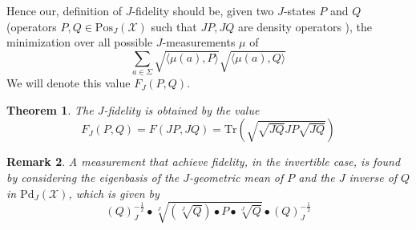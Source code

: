 \documentclass{amsart}
\numberwithin{equation}{section}
\newtheorem{theorem}{Theorem}[section]
\newtheorem{remark}[theorem]{Remark}
\theoremstyle{definition}
\theoremstyle{plain}
\theoremstyle{solutionstyle}
\begin{document}
Hence our, definition of $J$-fidelity should be, given two $J$-states $P$ and $Q$ (operators $P,Q\in \mathrm{Pos}_J(\mathcal{X})$ such that $JP,JQ$ are density operators \cite{FelipeSosa2022}), the minimization over all possible $J$-measurements $\mu$ of 
\begin{equation*}\sum_{a\in \Sigma}\sqrt{\langle \mu(a), P\rangle}\sqrt{\langle \mu(a),Q\rangle}\end{equation*}
We will denote this value $F_J(P,Q)$.
\begin{theorem}
    The $J$-fidelity is obtained by the value 
    \begin{equation*}F_J(P,Q)=F(JP,JQ)=\mathrm{Tr}\left(\sqrt{\sqrt{{JQ}}JP\sqrt{{JQ}}}\right)\end{equation*}
\end{theorem}
\begin{remark}\label{Fidelity remark}
A measurement that achieve fidelity, in the invertible case, is found by considering the eigenbasis of the $J$-geometric mean of $P$ and the $J$ inverse of $Q$ in $\mathrm{Pd}_J(\mathcal{X})$, which is given by \begin{equation}\label{J-fidelity matrix} (Q)^{-\frac{1}{2}}_J\bullet\sqrt[J]{(\sqrt[J]{Q})\bullet P\bullet\sqrt[J]{Q}}\bullet (Q)^{-\frac{1}{2}}_J\end{equation}


\end{remark}
\end{document}
